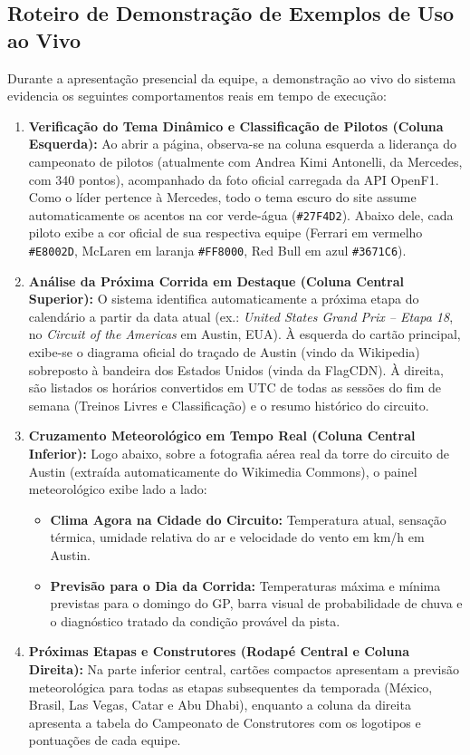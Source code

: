 \documentclass[12pt]{article}
\begin{document}
\subsection{Roteiro de Demonstração de Exemplos de Uso ao Vivo}

Durante a apresentação presencial da equipe, a demonstração ao vivo do sistema evidencia os seguintes comportamentos reais em tempo de execução:

\begin{enumerate}
    \item \textbf{Verificação do Tema Dinâmico e Classificação de Pilotos (Coluna Esquerda):} Ao abrir a página, observa-se na coluna esquerda a liderança do campeonato de pilotos (atualmente com Andrea Kimi Antonelli, da Mercedes, com 340 pontos), acompanhado da foto oficial carregada da API OpenF1. Como o líder pertence à Mercedes, todo o tema escuro do site assume automaticamente os acentos na cor verde-água (\texttt{\#27F4D2}). Abaixo dele, cada piloto exibe a cor oficial de sua respectiva equipe (Ferrari em vermelho \texttt{\#E8002D}, McLaren em laranja \texttt{\#FF8000}, Red Bull em azul \texttt{\#3671C6}).
    \item \textbf{Análise da Próxima Corrida em Destaque (Coluna Central Superior):} O sistema identifica automaticamente a próxima etapa do calendário a partir da data atual (ex.: \textit{United States Grand Prix -- Etapa 18}, no \textit{Circuit of the Americas} em Austin, EUA). À esquerda do cartão principal, exibe-se o diagrama oficial do traçado de Austin (vindo da Wikipedia) sobreposto à bandeira dos Estados Unidos (vinda da FlagCDN). À direita, são listados os horários convertidos em UTC de todas as sessões do fim de semana (Treinos Livres e Classificação) e o resumo histórico do circuito.
    \item \textbf{Cruzamento Meteorológico em Tempo Real (Coluna Central Inferior):} Logo abaixo, sobre a fotografia aérea real da torre do circuito de Austin (extraída automaticamente do Wikimedia Commons), o painel meteorológico exibe lado a lado:
    \begin{itemize}
        \item \textbf{Clima Agora na Cidade do Circuito:} Temperatura atual, sensação térmica, umidade relativa do ar e velocidade do vento em km/h em Austin.
        \item \textbf{Previsão para o Dia da Corrida:} Temperaturas máxima e mínima previstas para o domingo do GP, barra visual de probabilidade de chuva e o diagnóstico tratado da condição provável da pista.
    \end{itemize}
    \item \textbf{Próximas Etapas e Construtores (Rodapé Central e Coluna Direita):} Na parte inferior central, cartões compactos apresentam a previsão meteorológica para todas as etapas subsequentes da temporada (México, Brasil, Las Vegas, Catar e Abu Dhabi), enquanto a coluna da direita apresenta a tabela do Campeonato de Construtores com os logotipos e pontuações de cada equipe.
\end{enumerate}
\end{document}
